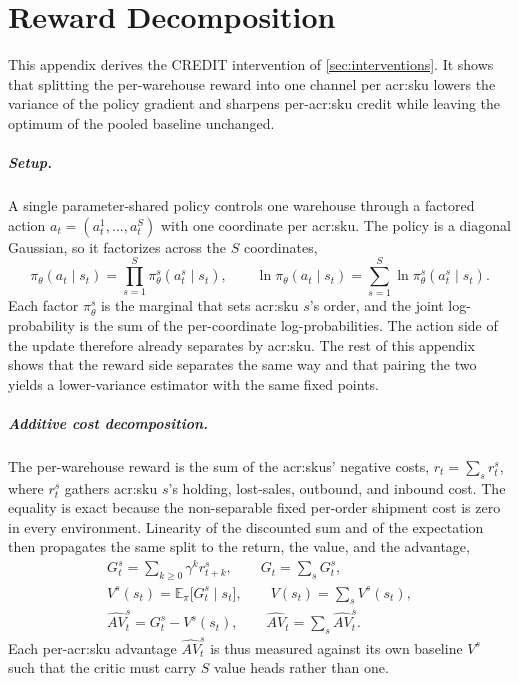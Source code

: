 \chapter{Reward Decomposition}
\label{ap:reward-decomposition}

This appendix derives the CREDIT intervention of \autoref{sec:interventions}.
It shows that splitting the per-warehouse reward into one channel per \gls{acr:sku} lowers
the variance of the policy gradient and sharpens per-\gls{acr:sku} credit while leaving the
optimum of the pooled baseline unchanged.

\paragraph{\textbf{Setup.}} A single parameter-shared policy controls one warehouse through a
factored action $a_t=(a_t^1,\dots,a_t^S)$ with one coordinate per \gls{acr:sku}. The policy is
a diagonal Gaussian, so it factorizes across the $S$ coordinates,
\begin{equation}
\pi_\theta(a_t\mid s_t)=\prod_{s=1}^{S}\pi_\theta^{s}(a_t^{s}\mid s_t),
\qquad
\ln\pi_\theta(a_t\mid s_t)=\sum_{s=1}^{S}\ln\pi_\theta^{s}(a_t^{s}\mid s_t).
\label{eq:factor}
\end{equation}
Each factor $\pi_\theta^{s}$ is the marginal that sets \gls{acr:sku} $s$'s order, and the joint
log-probability is the sum of the per-coordinate log-probabilities. The action side of the update
therefore already separates by \gls{acr:sku}. The rest of this appendix shows that the reward side
separates the same way and that pairing the two yields a lower-variance estimator with the same
fixed points.

\paragraph{\textbf{Additive cost decomposition.}} The per-warehouse reward is the sum of the
\glspl{acr:sku}' negative costs, $r_t=\sum_{s} r_t^{s}$, where $r_t^{s}$ gathers \gls{acr:sku}
$s$'s holding, lost-sales, outbound, and inbound cost. The equality is exact because the
non-separable fixed per-order shipment cost is zero in every environment.
Linearity of the discounted sum and of the expectation then propagates the same split to the
return, the value, and the advantage,
\begin{gather}
G_t^{s}=\sum_{k\ge 0}\gamma^{k} r_{t+k}^{s},\qquad
G_t=\sum_{s} G_t^{s},\\[2pt]
V^{s}(s_t)=\mathbb{E}_\pi\!\big[G_t^{s}\mid s_t\big],\qquad
V(s_t)=\sum_{s} V^{s}(s_t),\\[2pt]
\widehat{AV}_t^{s}=G_t^{s}-V^{s}(s_t),\qquad
\widehat{AV}_t=\sum_{s} \widehat{AV}_t^{s}.
\label{eq:advdecomp}
\end{gather}
Each per-\gls{acr:sku} advantage $\widehat{AV}_t^{s}$ is thus measured against its own baseline $V^{s}$ such that the critic must carry $S$ value heads rather than one.

